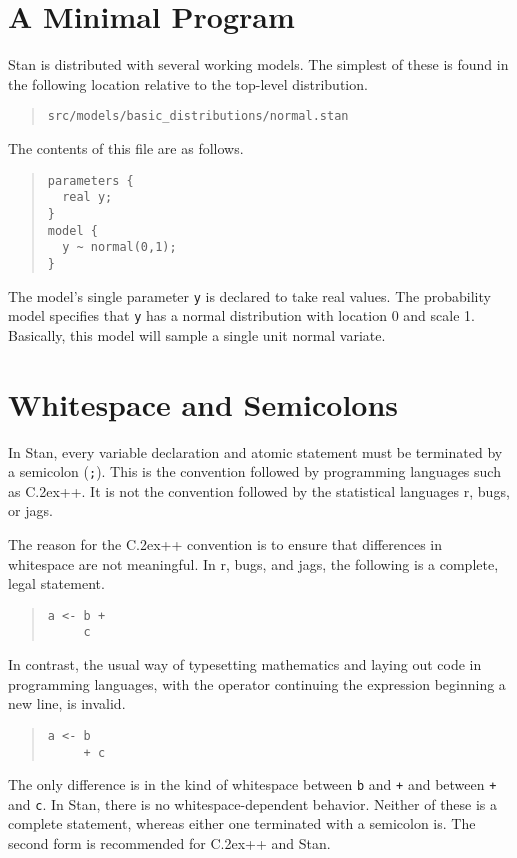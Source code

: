 \documentclass[10pt]{report}
\newcommand{\Stan}{Stan\xspace}
\newcommand*{\Cpp}{C\raise.2ex\hbox{\footnotesize ++}\xspace} %
\newcommand{\acronym}[1]{{\sc #1}\xspace}
\newcommand{\R}{\acronym{r}}
\newcommand{\BUGS}{\acronym{bugs}}
\newcommand{\JAGS}{\acronym{jags}}
\newcommand{\code}[1]{{\tt #1}}
\begin{document}
\section{A Minimal Program}

Stan is distributed with several working models.  The simplest of
these is found in the following location relative to the top-level
distribution.
%
\begin{quote}
\begin{Verbatim}
src/models/basic_distributions/normal.stan
\end{Verbatim}
\end{quote}
%
The contents of this file are as follows.
%
\begin{quote}
\begin{Verbatim}
parameters {
  real y;
}
model {
  y ~ normal(0,1);
}
\end{Verbatim}
\end{quote}
%
The model's single parameter \code{y} is declared to take real values.
The probability model specifies that \code{y} has a normal
distribution with location 0 and scale 1.  Basically, this model will
sample a single unit normal variate.  

\section{Whitespace and Semicolons}

In Stan, every variable declaration and atomic statement must be
terminated by a semicolon (\code{;}).  This is the convention followed
by programming languages such as \Cpp.  It is not the convention
followed by the statistical languages \R, \BUGS, or \JAGS.

The reason for the \Cpp convention is to ensure that differences in
whitespace are not meaningful.  In \R, \BUGS, and \JAGS, the following
is a complete, legal statement.
%
\begin{quote}
\begin{Verbatim}
a <- b +
     c
\end{Verbatim}
\end{quote}
%
In contrast, the usual way of typesetting mathematics and laying out
code in programming languages, with the operator continuing the
expression beginning a new line, is invalid.
%
\begin{quote}
\begin{Verbatim}
a <- b
     + c
\end{Verbatim}
\end{quote}
%
The only difference is in the kind of whitespace between \code{b} and
\code{+} and between \code{+} and \code{c}.  In \Stan, there is no
whitespace-dependent behavior.  Neither of these is a complete
statement, whereas either one terminated with a semicolon is.  The
second form is recommended for \Cpp and \Stan.
\end{document}
